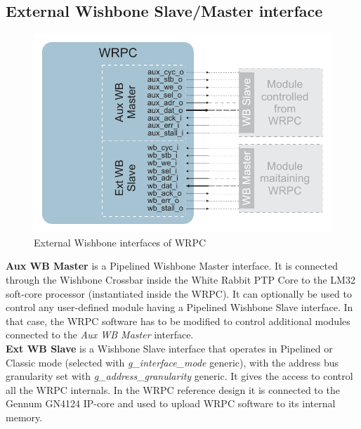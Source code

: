 \subsection{External Wishbone Slave/Master interface}

\begin{figure}[ht]
  \begin{center}
    \includegraphics[width=.7\textwidth]{fig/wrpc_wb.pdf}
    \caption{External Wishbone interfaces of WRPC}
  \end{center}
\end{figure}

{\bf Aux WB Master} is a Pipelined Wishbone Master interface. It is connected
through the Wishbone Crossbar inside the White Rabbit PTP Core to the LM32 soft-core
processor (instantiated inside the WRPC). It can optionally be used to control
any user-defined module having a Pipelined Wishbone Slave interface. In that case, the WRPC software
has to be modified to control additional modules connected to the \emph{Aux WB
Master} interface.\\

{\bf Ext WB Slave} is a Wishbone Slave interface that operates in Pipelined or
Classic mode (selected with \emph{g\_interface\_mode} generic), with the address bus
granularity set with \linebreak \emph{g\_address\_granularity} generic. It gives the access
to control all the WRPC internals. In the WRPC reference design it is connected to
the Gennum GN4124 IP-core and used to upload WRPC software to its internal memory.\\

